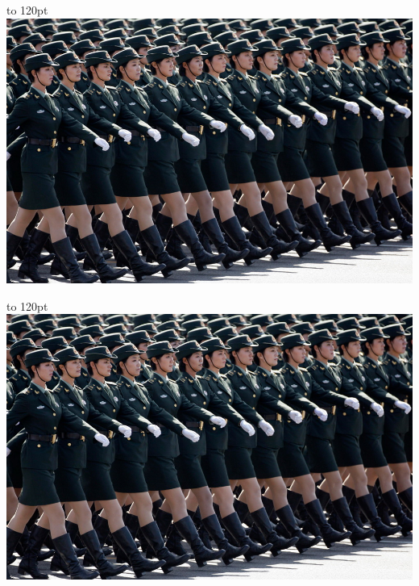 \documentclass[twoside]{book}
\makeatletter
\providecommand{\cleartoevenpage}[1][\@empty]{%
 \clearpage%
 \ifodd\c@page\null#1\clearpage\fi}
\makeatother
\begin{document}
\mainmatter
\null\newpage
\cleartoevenpage
\checkoddpage%
{\parindent0pt
\vbox to 120pt{\lipsum[1]}%
\includegraphics[height=0.78\textheight]{china-05}}

{\parindent0pt
\vbox to 120pt{\lipsum[1]}%
\hspace*{\dimexpr(-2in-\textwidth-2\evensidemargin)}
\includegraphics[height=0.78\textheight]{china-05}}
\hspace{1em}\parbox[b]{0.35\textwidth}{\lipsum[1-2]}
\end{document}
